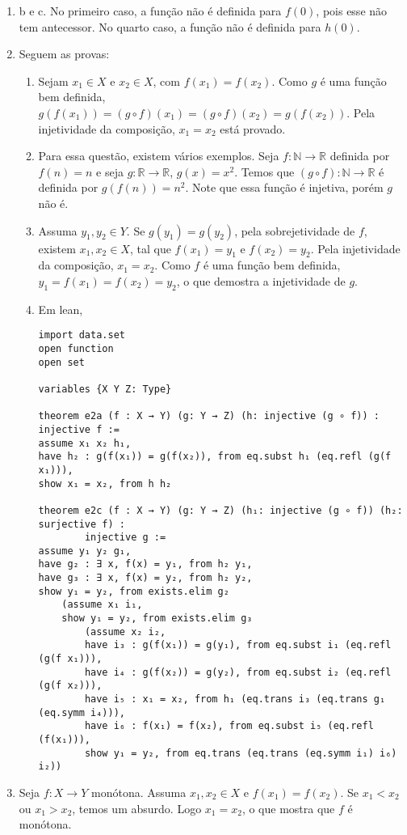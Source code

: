 \begin{enumerate}
    \item b e c. No primeiro caso, a função não é definida para $f(0)$, pois
    esse não tem antecessor. No quarto caso, a função não é definida para
    $h(0)$. 
    \item Seguem as provas: 
    \begin{enumerate}
        \item Sejam $x_1 \in X$ e $x_2 \in X$, com $f(x_1) = f(x_2)$. Como $g$
       é uma função bem definida, $g(f(x_1)) = (g \circ f)(x_1) = (g \circ
       f)(x_2) = g(f(x_2))$. Pela injetividade da composição, $x_1 = x_2$ está
        provado. 
        \item Para essa questão, existem vários exemplos. Seja $f : \mathbb{N}
        \to \mathbb{R} $ definida por $f(n) = n$ e seja $g : \mathbb{R} \to
        \mathbb{R}$, $g(x) = x^2 $. Temos que $(g \circ f) : \mathbb{N} \to
        \mathbb{R}$ é definida por $g(f(n)) = n^2$. Note que essa função é
        injetiva, porém $g$ não é. 
        \item Assuma $y_1, y_2 \in Y$. Se $g(y_1) = g(y_2)$, pela
        sobrejetividade de $f$, existem $x_1, x_2 \in X$, tal que $f(x_1) =
        y_1$ e $f(x_2) = y_2$. Pela injetividade da composição, $x_1 = x_2$.
        Como $f$ é uma função bem definida, $y_1 = f(x_1) = f(x_2) = y_2$, o
        que demostra a injetividade de $g$.
        \item Em lean, 
\begin{lstlisting}
import data.set 
open function
open set 

variables {X Y Z: Type}

theorem e2a (f : X → Y) (g: Y → Z) (h: injective (g ∘ f)) : injective f := 
assume x₁ x₂ h₁,
have h₂ : g(f(x₁)) = g(f(x₂)), from eq.subst h₁ (eq.refl (g(f x₁))), 
show x₁ = x₂, from h h₂

theorem e2c (f : X → Y) (g: Y → Z) (h₁: injective (g ∘ f)) (h₂: surjective f) :
        injective g := 
assume y₁ y₂ g₁, 
have g₂ : ∃ x, f(x) = y₁, from h₂ y₁,
have g₃ : ∃ x, f(x) = y₂, from h₂ y₂,
show y₁ = y₂, from exists.elim g₂ 
    (assume x₁ i₁, 
    show y₁ = y₂, from exists.elim g₃ 
        (assume x₂ i₂, 
        have i₃ : g(f(x₁)) = g(y₁), from eq.subst i₁ (eq.refl (g(f x₁))),
        have i₄ : g(f(x₂)) = g(y₂), from eq.subst i₂ (eq.refl (g(f x₂))),
        have i₅ : x₁ = x₂, from h₁ (eq.trans i₃ (eq.trans g₁ (eq.symm i₄))), 
        have i₆ : f(x₁) = f(x₂), from eq.subst i₅ (eq.refl (f(x₁))),
        show y₁ = y₂, from eq.trans (eq.trans (eq.symm i₁) i₆) i₂))    
\end{lstlisting}
    \end{enumerate}
    \item Seja $f: X \to Y$ monótona. Assuma $x_1, x_2 \in X$ e $f(x_1) =
    f(x_2)$. Se $x_1 < x_2$ ou $x_1 > x_2$, temos um absurdo. Logo $x_1 =
    x_2$, o que mostra que $f$ é monótona. 


\end{enumerate}
